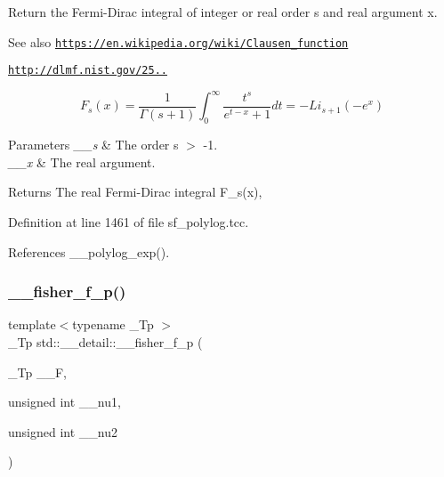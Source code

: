 Return the Fermi-\/\+Dirac integral of integer or real order s and real argument x. \begin{DoxySeeAlso}{See also}
\href{https://en.wikipedia.org/wiki/Clausen_function}{\tt https\+://en.\+wikipedia.\+org/wiki/\+Clausen\+\_\+function} 

\href{http://dlmf.nist.gov/25.12.16}{\tt http\+://dlmf.\+nist.\+gov/25..}
\end{DoxySeeAlso}
\[ F_s(x) = \frac{1}{\Gamma(s+1)}\int_0^\infty \frac{t^s}{e^{t-x} + 1}dt = -Li_{s+1}(-e^x) \]


\begin{DoxyParams}{Parameters}
{\em \+\_\+\+\_\+s} & The order s $>$ -\/1. \\
\hline
{\em \+\_\+\+\_\+x} & The real argument. \\
\hline
\end{DoxyParams}
\begin{DoxyReturn}{Returns}
The real Fermi-\/\+Dirac integral F\+\_\+s(x), 
\end{DoxyReturn}


Definition at line 1461 of file sf\+\_\+polylog.\+tcc.



References \+\_\+\+\_\+polylog\+\_\+exp().

\mbox{\label{namespacestd_1_1____detail_aee8f7c61fee93660eede2ed37cf58386}} 
\subsubsection{\texorpdfstring{\+\_\+\+\_\+fisher\+\_\+f\+\_\+p()}{\_\_fisher\_f\_p()}}
{\footnotesize\ttfamily template$<$typename \+\_\+\+Tp $>$ \\
\+\_\+\+Tp std\+::\+\_\+\+\_\+detail\+::\+\_\+\+\_\+fisher\+\_\+f\+\_\+p (\begin{DoxyParamCaption}\item[{\+\_\+\+Tp}]{\+\_\+\+\_\+F,  }\item[{unsigned int}]{\+\_\+\+\_\+nu1,  }\item[{unsigned int}]{\+\_\+\+\_\+nu2 }\end{DoxyParamCaption})}



